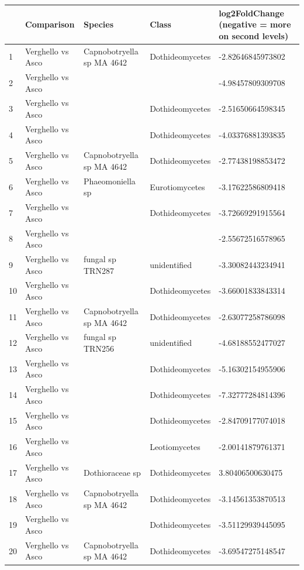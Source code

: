 \documentclass[12pt]{article}\usepackage[]{graphicx}\usepackage[]{color}
\numberwithin{figure}{section}
\begin{document}
\begin{table}[ht]
\centering
\begingroup\tiny
\begin{tabular}{lllll}
  \hline
 & Comparison & Species & Class & log2FoldChange 
 (negative = more on second levels) \\ 
  \hline
1 & Verghello vs Asco & Capnobotryella sp MA 4642 & Dothideomycetes & -2.82646845973802 \\ 
  2 & Verghello vs Asco &  &  & -4.98457809309708 \\ 
  3 & Verghello vs Asco &  & Dothideomycetes & -2.51650664598345 \\ 
  4 & Verghello vs Asco &  & Dothideomycetes & -4.03376881393835 \\ 
  5 & Verghello vs Asco & Capnobotryella sp MA 4642 & Dothideomycetes & -2.77438198853472 \\ 
  6 & Verghello vs Asco & Phaeomoniella sp & Eurotiomycetes & -3.17622586809418 \\ 
  7 & Verghello vs Asco &  & Dothideomycetes & -3.72669291915564 \\ 
  8 & Verghello vs Asco &  &  & -2.55672516578965 \\ 
  9 & Verghello vs Asco & fungal sp TRN287 & unidentified & -3.30082443234941 \\ 
  10 & Verghello vs Asco &  & Dothideomycetes & -3.66001833843314 \\ 
  11 & Verghello vs Asco & Capnobotryella sp MA 4642 & Dothideomycetes & -2.63077258786098 \\ 
  12 & Verghello vs Asco & fungal sp TRN256 & unidentified & -4.68188552477027 \\ 
  13 & Verghello vs Asco &  & Dothideomycetes & -5.16302154955906 \\ 
  14 & Verghello vs Asco &  & Dothideomycetes & -7.32777284814396 \\ 
  15 & Verghello vs Asco &  & Dothideomycetes & -2.84709177074018 \\ 
  16 & Verghello vs Asco &  & Leotiomycetes & -2.00141879761371 \\ 
  17 & Verghello vs Asco & Dothioraceae sp & Dothideomycetes & 3.80406500630475 \\ 
  18 & Verghello vs Asco & Capnobotryella sp MA 4642 & Dothideomycetes & -3.14561353870513 \\ 
  19 & Verghello vs Asco &  & Dothideomycetes & -3.51129939445095 \\ 
  20 & Verghello vs Asco & Capnobotryella sp MA 4642 & Dothideomycetes & -3.69547275148547 \\ 

\end{tabular}
\end{table}
\end{document}
